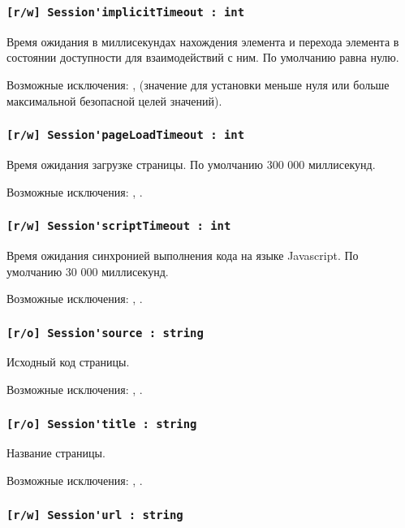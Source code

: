 \subsubsection{\lstinline|[r/w] Session'implicitTimeout : int|}

Время ожидания в миллисекундах нахождения элемента и перехода элемента в состоянии доступности для взаимодействий с ним. По умолчанию равна нулю.

Возможные исключения: ,  (значение для установки меньше нуля или больше максимальной безопасной целей значений).

\subsubsection{\lstinline|[r/w] Session'pageLoadTimeout : int|}

Время ожидания загрузке страницы. По умолчанию 300 000 миллисекунд.

Возможные исключения: , .

\subsubsection{\lstinline|[r/w] Session'scriptTimeout : int|}

Время ожидания синхронией выполнения кода на языке Javascript. По умолчанию 30 000 миллисекунд.

Возможные исключения: , .

\subsubsection{\lstinline|[r/o] Session'source : string|}

Исходный код страницы.

Возможные исключения: , .

\subsubsection{\lstinline|[r/o] Session'title : string|}

Название страницы.

Возможные исключения: , .

\subsubsection{\lstinline|[r/w] Session'url : string|}

